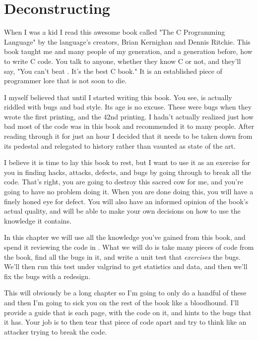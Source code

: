 \chapter{Deconstructing \krc}

When I was a kid I read this awesome book called "The C Programming Language"
by the language's creators, Brian Kernighan and Dennis Ritchie.  This book 
taught me and many people of my generation, and a generation before, how to
write C code.  You talk to anyone, whether they know C or not, and they'll
say, "You can't beat \krc. It's the best C book."  It is an established
piece of programmer lore that is not soon to die.

I myself believed that until I started writing this book. You see, \krc is
actually riddled with bugs and bad style.  Its age is no excuse. These were
bugs when they wrote the first printing, and the 42nd printing.  I hadn't
actually realized just how bad most of the code was in this book and recommended
it to many people.  After reading through it for just an hour I decided that it
needs to be taken down from its pedestal and relegated to history rather than
vaunted as state of the art.

I believe it is time to lay this book to rest, but I want to use it as an
exercise for you in finding hacks, attacks, defects, and bugs by going through
\krc to break all the code.  That's right, you are going to destroy this
sacred cow for me, and you're going to have no problem doing it.  When you are
done doing this, you will have a finely honed eye for defect.  You will also
have an informed opinion of the book's actual quality, and will be able to make
your own decisions on how to use the knowledge it contains.

In this chapter we will use all the knowledge you've gained from
this book, and spend it reviewing the code in \krc.  What we will do is
take many pieces of code from the book, find all the bugs in it, and write
a unit test that \emph{exercises} the bugs.  We'll then run this test under
valgrind to get statistics and data, and then we'll fix the bugs with a redesign.

This will obviously be a long chapter so I'm going to only do a handful of
these and then I'm going to sick you on the rest of the book like a bloodhound.
I'll provide a guide that is each page, with the code on it, and hints to the
bugs that it has.  Your job is to then tear that piece of code apart and try to
think like an attacker trying to break the code.

